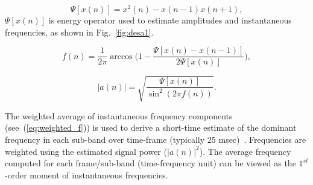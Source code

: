 {\begin{equation}
\Psi [x(n)] = x^2(n)-x(n-1)x(n+1),
\end{equation}
$\Psi [x(n)]$ is energy operator used to estimate amplitudes and instantaneous frequencies, as shown in Fig.~\ref{fig:desa1}. 


\begin{equation}
\label{eq:instfreq}
f(n) = \frac{1}{2\pi}\arccos \Big (1-\frac{\Psi[x(n)-x(n-1)]}{2\Psi[x(n)]}\Big),
\end{equation}
 
 
\begin{equation}
\label{eq:instamp}
|a(n)| = \sqrt{\frac{\Psi[x(n)]}{\sin^2(2\pi f(n))}}.
\end{equation}




The weighted average of instantaneous frequency components (see~(\ref{eq:weighted_f})) is used to derive a short-time estimate of the dominant frequency in each sub-band over time-frame (typically 25 msec)~\cite{cohenlee90}. 
Frequencies are weighted using the estimated signal power ($|a(n)|^2$). 
The average frequency computed for each frame/sub-band (time-frequency unit) can be viewed as the $1^{st}$-order moment of instantaneous frequencies.  


}
